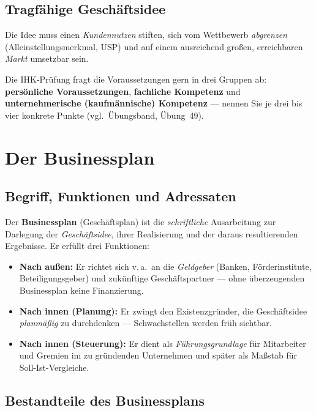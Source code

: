 \documentclass[11pt, a4paper]{article}
\begin{document}
\subsection{Tragfähige Geschäftsidee}

Die Idee muss einen \emph{Kundennutzen} stiften, sich vom Wettbewerb \emph{abgrenzen}
(Alleinstellungsmerkmal, USP) und auf einem ausreichend großen, erreichbaren \emph{Markt}
umsetzbar sein.

\begin{merksatz}
Die IHK-Prüfung fragt die Voraussetzungen gern in drei Gruppen ab: \textbf{persönliche
Voraussetzungen}, \textbf{fachliche Kompetenz} und \textbf{unternehmerische
(kaufmännische) Kompetenz} --- nennen Sie je drei bis vier konkrete Punkte
(vgl.\ Übungsband, Übung~49).
\end{merksatz}

\section{Der Businessplan}

\subsection{Begriff, Funktionen und Adressaten}

Der \textbf{Businessplan} (Geschäftsplan) ist die \emph{schriftliche} Ausarbeitung zur
Darlegung der \emph{Geschäftsidee}, ihrer Realisierung und der daraus resultierenden
Ergebnisse. Er erfüllt drei Funktionen:

\begin{itemize}
  \item \textbf{Nach außen:} Er richtet sich v.\,a.\ an die \emph{Geldgeber} (Banken,
    Förderinstitute, Beteiligungsgeber) und zukünftige Geschäftspartner --- ohne
    überzeugenden Businessplan keine Finanzierung.
  \item \textbf{Nach innen (Planung):} Er zwingt den Existenzgründer, die Geschäftsidee
    \emph{planmäßig} zu durchdenken --- Schwachstellen werden früh sichtbar.
  \item \textbf{Nach innen (Steuerung):} Er dient als \emph{Führungsgrundlage} für
    Mitarbeiter und Gremien im zu gründenden Unternehmen und später als Maßstab für
    Soll-Ist-Vergleiche.
\end{itemize}

\subsection{Bestandteile des Businessplans}
\end{document}
